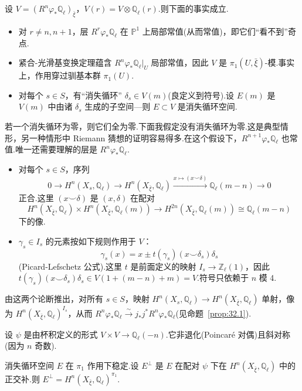 设 $V = (R^{n}\varphi_{*}\mathbb{Q}_{\ell})_{\bar{\xi}}$，$V(r) = V \otimes \mathbb{Q}_{\ell}(r)$.则下面的事实成立.
\begin{itemize}
  \item 对 $r \neq n, n+1$，层 $R^{r}\varphi_{*}\mathbb{Q}_{\ell}$ 在 $\mathbb{P}^{1}$ 上局部常值(从而常值)，即它们``看不到''奇点.
  \item 紧合-光滑基变换定理蕴含 $R^{n}\varphi_{*}\mathbb{Q}_{\ell}|_{U}$ 局部常值，因此 $V$ 是 $\pi_1(U, \bar{\xi})$-模.事实上，作用穿过驯基本群 $\pi_1(U)$.
  \item 对每个 $s \in S$，有``消失循环'' $\delta_s \in V(m)$(良定义到符号).设 $E(m)$ 是 $V(m)$ 中由诸 $\delta_s$ 生成的子空间---则 $E \subset V$ 是消失循环空间.
\end{itemize}
若一个消失循环为零，则它们全为零.下面我假定没有消失循环为零.这是典型情形，另一种情形中 Riemann 猜想的证明容易得多.在这个假设下，$R^{n+1}\varphi_{*}\mathbb{Q}_{\ell}$ 也常值.唯一还需要理解的层是 $R^{n}\varphi_{*}\mathbb{Q}_{\ell}$.

\begin{itemize}
  \item 对每个 $s \in S$，序列
  \[
  0 \to H^{n}(X_s, \mathbb{Q}_{\ell}) \to H^{n}(X_{\bar{\xi}}, \mathbb{Q}_{\ell}) \xrightarrow{x \mapsto (x \smile \delta)} \mathbb{Q}_{\ell}(m - n) \to 0
  \]
  正合.这里 $(x \smile \delta)$ 是 $(x, \delta)$ 在配对
  \[
  H^{n}(X_{\bar{\xi}}, \mathbb{Q}_{\ell}) \times H^{n}(X_{\bar{\xi}}, \mathbb{Q}_{\ell}(m)) \to H^{2n}(X_{\bar{\xi}}, \mathbb{Q}_{\ell}(m)) \cong \mathbb{Q}_{\ell}(m - n)
  \]
  下的像.
  \item $\gamma_s \in I_s$ 的元素按如下规则作用于 $V$：
  \[
  \gamma_s(x) = x \pm t(\gamma_s)(x \smile \delta_s)\delta_s
  \]
  (Picard-Lefschetz 公式).这里 $t$ 是前面定义的映射 $I_s \to \mathbb{Z}_{\ell}(1)$，因此 $t(\gamma_s)(x \smile \delta_s)\delta_s \in V(1 + (m - n) + m) = V$.符号只依赖于 $n$ 模 4.
\end{itemize}
由这两个论断推出，对所有 $s \in S$，映射 $H^{n}(X_s, \mathbb{Q}_{\ell}) \to H^{n}(X_{\bar{\xi}}, \mathbb{Q}_{\ell})$ 单射，像为 $H^{n}(X_{\bar{\xi}}, \mathbb{Q}_{\ell})^{I_s}$，从而 $R^{n}\varphi_{*}\mathbb{Q}_{\ell} \xrightarrow{\sim} j_{*}j^{*}R^{n}\varphi_{*}\mathbb{Q}_{\ell}$(见命题~\ref{prop:32.1}).

设 $\psi$ 是由杯积定义的形式 $V \times V \to \mathbb{Q}_{\ell}(-n)$.它非退化(Poincar\'e 对偶)且斜对称(因为 $n$ 奇数).

\begin{proposition}\label{prop:32.2}
消失循环空间 $E$ 在 $\pi_1$ 作用下稳定.设 $E^{\perp}$ 是 $E$ 在配对 $\psi$ 下在 $H^{n}(X_{\bar{\xi}}, \mathbb{Q}_{\ell})$ 中的正交补.则 $E^{\perp} = H^{n}(X_{\bar{\xi}}, \mathbb{Q}_{\ell})^{\pi_1}$.
\end{proposition}

